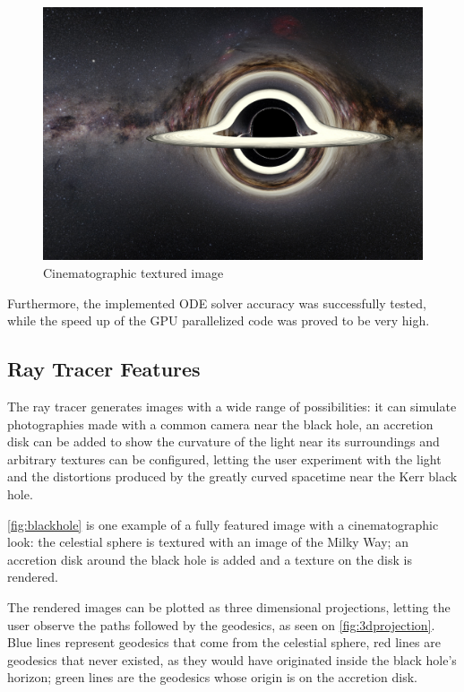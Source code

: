 \begin{figure}[bth]
	\myfloatalign
	\includegraphics[width=\linewidth]{gfx/bh_texture_disk}
	\caption[Cinematographic textured image]{Cinematographic textured image}
	\label{fig:blackhole}
\end{figure}

Furthermore, the implemented \ac{ODE} solver accuracy was successfully tested, while the speed up of the \ac{GPU} parallelized code was proved to be very high.

\subsection{Ray Tracer Features}

The ray tracer generates images with a wide range of possibilities: it can simulate photographies made with a common camera near the black hole, an accretion disk can be added to show the curvature of the light near its surroundings and arbitrary textures can be configured, letting the user experiment with the light and the distortions produced by the greatly curved spacetime near the Kerr black hole.

\autoref{fig:blackhole} is one example of a fully featured image with a cinematographic look: the celestial sphere is textured with an image of the Milky Way; an accretion disk around the black hole is added and a texture on the disk is rendered.

The rendered images can be plotted as three dimensional projections, letting the user observe the paths followed by the geodesics, as seen on \autoref{fig:3dprojection}. Blue lines represent geodesics that come from the celestial sphere, red lines are geodesics that never existed, as they would have originated inside the black hole's horizon; green lines are the geodesics whose origin is on the accretion disk.

